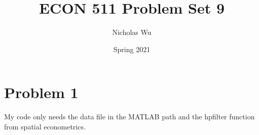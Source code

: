 \documentclass[10pt,letter]{article}
\newcommand{\problem}[1]{\section*{Problem #1}}
\begin{document}


\title{ECON 511 Problem Set 9}

\author{Nicholas Wu}

\date{Spring 2021}

\maketitle

\problem{1}
My code only needs the data file in the MATLAB path and the hpfilter function from spatial econometrics.
\end{document}
